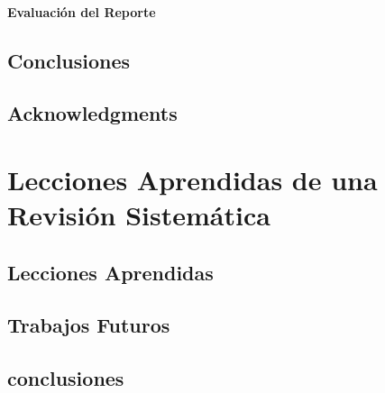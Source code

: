 \documentclass{report}
\begin{document}
            \subsubsection{Evaluación del Reporte}
        
    \section{Conclusiones}
    
    \section*{Acknowledgments} %

    
    \newpage
    
    
    
    
\chapter{Lecciones Aprendidas de una Revisión Sistemática}
    
    \section{Lecciones Aprendidas}
    
    \section{Trabajos Futuros}
    
    \section{conclusiones}
\end{document}
